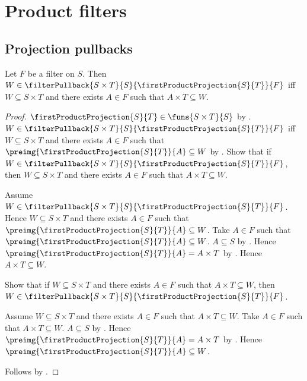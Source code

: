 \section{Product filters}





\subsection{Projection pullbacks}

\begin{theorem}\label{first_projection_filter_pullback_iff}
    Let $F$ be a filter on $S$.
    Then $W\in\filterPullback{S\times T}{S}{
        \firstProductProjection{S}{T}}{F}$ iff
        $W\subseteq S\times T$ and there exists $A\in F$ such that
        $A\times T\subseteq W$.
\end{theorem}
\begin{proof}
    $\firstProductProjection{S}{T}\in\funs{S\times T}{S}$ by
        .
    $W\in\filterPullback{S\times T}{S}{
        \firstProductProjection{S}{T}}{F}$ iff
        $W\subseteq S\times T$ and there exists $A\in F$ such that
        $\preimg{\firstProductProjection{S}{T}}{A}\subseteq W$ by
        .
    Show that if $W\in\filterPullback{S\times T}{S}{
        \firstProductProjection{S}{T}}{F}$, then
        $W\subseteq S\times T$ and there exists $A\in F$ such that
        $A\times T\subseteq W$.
    \begin{subproof}
        Assume $W\in\filterPullback{S\times T}{S}{
            \firstProductProjection{S}{T}}{F}$.
        Hence $W\subseteq S\times T$ and there exists $A\in F$ such that
            $\preimg{\firstProductProjection{S}{T}}{A}\subseteq W$.
        Take $A\in F$ such that
            $\preimg{\firstProductProjection{S}{T}}{A}\subseteq W$.
        $A\subseteq S$ by .
        Hence $\preimg{\firstProductProjection{S}{T}}{A}=A\times T$ by
            .
        Hence $A\times T\subseteq W$.
    \end{subproof}
    Show that if $W\subseteq S\times T$ and there exists $A\in F$ such
        that $A\times T\subseteq W$, then
        $W\in\filterPullback{S\times T}{S}{
            \firstProductProjection{S}{T}}{F}$.
    \begin{subproof}
        Assume $W\subseteq S\times T$ and there exists $A\in F$ such that
            $A\times T\subseteq W$.
        Take $A\in F$ such that $A\times T\subseteq W$.
        $A\subseteq S$ by .
        Hence $\preimg{\firstProductProjection{S}{T}}{A}=A\times T$ by
            .
        Hence $\preimg{\firstProductProjection{S}{T}}{A}\subseteq W$.
    \end{subproof}
    Follows by \auto.
\end{proof}

